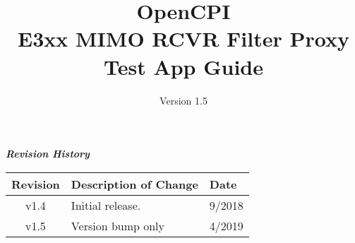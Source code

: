 \iffalse
This file is protected by Copyright. Please refer to the COPYRIGHT file
distributed with this source distribution.

This file is part of OpenCPI <http://www.opencpi.org>

OpenCPI is free software: you can redistribute it and/or modify it under the
terms of the GNU Lesser General Public License as published by the Free Software
Foundation, either version 3 of the License, or (at your option) any later
version.

OpenCPI is distributed in the hope that it will be useful, but WITHOUT ANY
WARRANTY; without even the implied warranty of MERCHANTABILITY or FITNESS FOR A
PARTICULAR PURPOSE. See the GNU Lesser General Public License for more details.

You should have received a copy of the GNU Lesser General Public License along
with this program. If not, see <http://www.gnu.org/licenses/>.
\fi

\def\docTitle{OpenCPI\\ E3xx MIMO RCVR Filter Proxy Test App Guide}
\def\docVersion{1.5}
\def\snippetpath{../../../../../../doc/av/tex/snippets}


\date{Version \docVersion} %
\title{\docTitle}
\usepackage{graphicx}
\graphicspath{ {figures/} }
\usepackage{textcomp}
\usepackage{listings}


\maketitle
	\begin{center}
	\textit{\textbf{Revision History}}
		\begin{table}[H]
		\label{table:revisions} %
			\begin{tabularx}{\textwidth}{|c|X|l|}
			\hline
			\rowcolor{blue}
			\textbf{Revision} & \textbf{Description of Change} & \textbf{Date} \\
		    \hline
		    v1.4 & Initial release. & 9/2018 \\
			\hline
		    v1.5 & Version bump only & 4/2019 \\
			\hline
			\end{tabularx}
		\end{table}
	\end{center}

